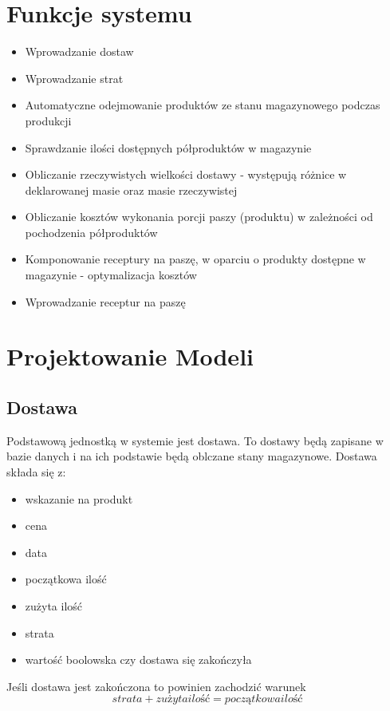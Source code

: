\documentclass[shortabstract]{iithesis}
\begin{document}
\chapter{Funkcje systemu}
	\begin{itemize}
  		\item  Wprowadzanie dostaw
  		\item  Wprowadzanie strat
  		\item  Automatyczne odejmowanie produktów ze stanu magazynowego podczas produkcji
  		\item  Sprawdzanie ilości dostępnych półproduktów w magazynie
  		\item  Obliczanie rzeczywistych wielkości dostawy - występują różnice w deklarowanej masie oraz masie rzeczywistej
  		\item  Obliczanie kosztów wykonania porcji paszy (produktu) w zależności od pochodzenia półproduktów
  		\item  Komponowanie receptury na paszę, w oparciu o produkty dostępne w magazynie - optymalizacja kosztów
  		\item  Wprowadzanie receptur na paszę
	\end{itemize} 


\chapter{Projektowanie Modeli}

\section{Dostawa}
Podstawową jednostką w systemie jest dostawa. To dostawy będą zapisane w bazie danych i na ich podstawie będą oblczane stany magazynowe.
Dostawa składa się z:
\begin{itemize}
	\item wskazanie na produkt
	\item cena
	\item data
	\item początkowa ilość
	\item zużyta ilość
	\item strata
	\item wartość boolowska czy dostawa się zakończyła
\end{itemize}

Jeśli dostawa jest zakończona to powinien zachodzić warunek $$strata + zużyta ilość = początkowa ilość$$
\end{document}
